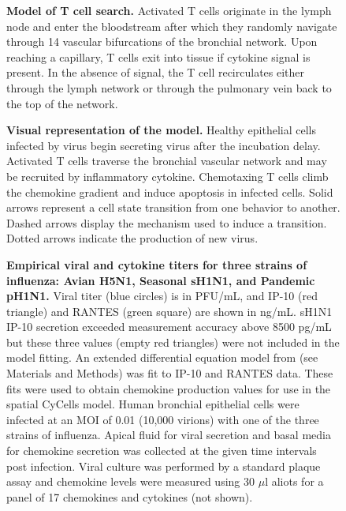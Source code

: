 \documentclass[10pt]{article}
\begin{document}
\begin{figure}[!ht]
\begin{center}
\end{center}
\caption{{\bf Model of T cell search.}  Activated T cells originate in the lymph node and enter the bloodstream after which they randomly navigate through 14 vascular bifurcations of the bronchial network.  Upon reaching a capillary, T cells exit into tissue if cytokine signal is present.  In the absence of signal, the T cell recirculates either through the lymph network or through the pulmonary vein back to the top of the network.}
\label{fig:systemchart}
\end{figure}

\begin{figure}[!ht]
\begin{center}
\end{center}
\caption{{\bf Visual representation of the model.}  Healthy epithelial cells infected by virus begin secreting virus after the incubation delay.  Activated T cells traverse the bronchial vascular network and may be recruited by inflammatory cytokine.  Chemotaxing T cells climb the chemokine gradient and induce apoptosis in infected cells.  Solid arrows represent a cell state transition from one behavior to another.  Dashed arrows display the mechanism used to induce a transition.  Dotted arrows indicate the production of new virus.}
\label{fig:modelchart}
\end{figure}

\begin{figure}[!ht]
\begin{center}
 \end{center}
\caption{{\bf Empirical viral and cytokine titers for three strains of influenza: Avian H5N1, Seasonal sH1N1, and Pandemic pH1N1.}  Viral titer (blue circles) is in PFU/mL, and IP-10 (red triangle) and RANTES (green square) are shown in ng/mL.   sH1N1 IP-10 secretion exceeded measurement accuracy above 8500 pg/mL but these three values (empty red triangles) were not included in the model fitting.  An extended differential equation model from \cite{Mitchell2011} (see Materials and Methods) was fit to IP-10 and RANTES data.  These fits were used to obtain chemokine production values for use in the spatial CyCells model.  Human bronchial epithelial cells were infected at an MOI of 0.01 (10,000 virions) with one of the three strains of influenza.  Apical fluid for viral secretion and basal media for chemokine secretion was collected at the given time intervals post infection.  Viral culture was performed by a standard plaque assay and chemokine levels were measured using 30 $\mu$l aliots for a panel of 17 chemokines and cytokines (not shown).} 
 \label{fig:data}
\end{figure}
\end{document}

